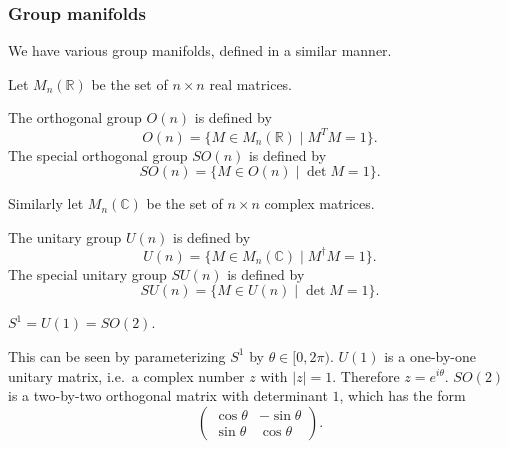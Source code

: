 \documentclass[12pt]{article}
\numberwithin{equation}{section}
\numberwithin{figure}{section}
\theoremstyle{remark}
\def\bC{\mathbb{C}}
\def\bR{\mathbb{R}}
\begin{document}
\subsubsection{Group manifolds}
We have various group manifolds, 
defined in a similar manner.
 
Let $M_n(\bR)$ be the set of $n\times n$ real matrices.
\begin{example}
The orthogonal group $O(n)$ is defined by \begin{equation}
  O(n) = \{ M\in M_n(\bR) \mid M^T M = 1 \}.
\end{equation}
The special orthogonal group $SO(n)$ is defined by \begin{equation}
  SO(n) = \{ M\in O(n) \mid \det M = 1 \}.
\end{equation}
\end{example}

Similarly let $M_n(\bC)$ be the set of $n\times n$ complex matrices.
\begin{example}
The unitary group $U(n)$ is defined by \begin{equation}
  U(n) = \{ M\in M_n(\bC) \mid M^\dagger M = 1 \}.
\end{equation}
The special unitary group $SU(n)$ is defined by \begin{equation}
  SU(n) = \{ M\in U(n) \mid \det M = 1 \}.
\end{equation}
\end{example}

\begin{proposition}
$S^1=U(1)=SO(2)$.
\end{proposition}
This can be seen by parameterizing $S^1$ by $\theta \in [0,2\pi)$.
$U(1)$ is a one-by-one unitary matrix, i.e.~a complex number $z$ with $|z|=1$.
Therefore $z=e^{i\theta}$.
$SO(2)$ is a two-by-two orthogonal matrix with determinant $1$, which has the form \begin{equation}
  \begin{pmatrix}
    \cos\theta & -\sin\theta \\
    \sin\theta & \cos\theta
  \end{pmatrix}.
\end{equation}
\end{document}
